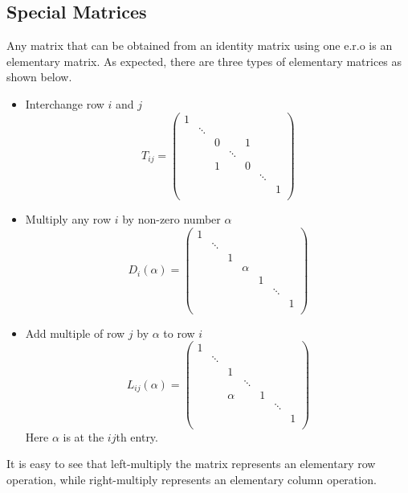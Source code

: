 \documentclass[11pt]{article}
\begin{document}
\subsection{Special Matrices}
\begin{definition}
  Any matrix that can be obtained from an identity matrix using one e.r.o is an elementary matrix.  As expected, there are three types of elementary matrices as shown below.
\end{definition}

\begin{itemize}
  \item Interchange row \(i\) and \(j\) \begin{equation*} T_{ij}=
    \begin{pmatrix}
      1 & & & & &  \\
      & \ddots& & &\\
      & & 0 & & 1  & & \\
      & & & \ddots  & & & \\
      & & 1 & & 0  & & \\
      & & & & &  \ddots & \\
      & & & & & & 1 \\
    \end{pmatrix}
  \end{equation*}
  \item Multiply any row \(i\) by non-zero number \(\alpha\) \begin{equation*} D_i(\alpha)=
    \begin{pmatrix}
      1 & & & & &  \\
      & \ddots & & & & &  \\
      & & 1 & & & &  \\
      & & & \alpha & & &  \\
      & & & & 1 & &  \\
      & & & & & \ddots &  \\
      & & & & & & 1 \\
    \end{pmatrix}
  \end{equation*}
  \item Add multiple of row \(j\) by \(\alpha\) to row \(i\) \begin{equation*} L_{ij}(\alpha)=
    \begin{pmatrix}
      1 & & & & &  \\
      & \ddots & & & & &  \\
      & & 1 & & & &  \\
      & & & \ddots & & &  \\
      & & \alpha & & 1 & &  \\
      & & & & & \ddots &  \\
      & & & & & & 1 \\
    \end{pmatrix}
  \end{equation*}
  Here \(\alpha\) is at the \(ij\)th entry.
\end{itemize}
It is easy to see that left-multiply the matrix represents an elementary row operation, while right-multiply represents an elementary column operation.
\end{document}
